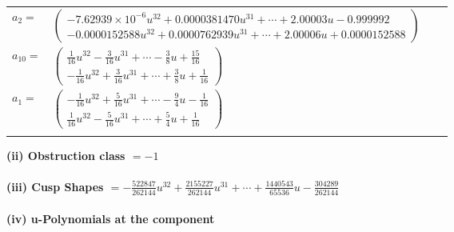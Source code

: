 \documentclass[1p]{elsarticle_modified}
\theoremstyle{definition}
\begin{document}
\begin{tabular}{m{7pt} m{180pt} m{7pt} m{180pt} }
\flushright $a_{2}=$&$\begin{pmatrix}-7.62939\times10^{-6} u^{32}+0.0000381470 u^{31}+\cdots+2.00003 u-0.999992\\-0.0000152588 u^{32}+0.0000762939 u^{31}+\cdots+2.00006 u+0.0000152588\end{pmatrix}$ \\
\flushright $a_{10}=$&$\begin{pmatrix}\frac{1}{16} u^{32}-\frac{3}{16} u^{31}+\cdots-\frac{3}{8} u+\frac{15}{16}\\-\frac{1}{16} u^{32}+\frac{3}{16} u^{31}+\cdots+\frac{3}{8} u+\frac{1}{16}\end{pmatrix}$ \\
\flushright $a_{1}=$&$\begin{pmatrix}-\frac{1}{16} u^{32}+\frac{5}{16} u^{31}+\cdots-\frac{9}{4} u-\frac{1}{16}\\\frac{1}{16} u^{32}-\frac{5}{16} u^{31}+\cdots+\frac{5}{4} u+\frac{1}{16}\end{pmatrix}$\\&\end{tabular}
\flushleft \textbf{(ii) Obstruction class $= -1$}\\~\\
\flushleft \textbf{(iii) Cusp Shapes $= -\frac{522847}{262144} u^{32}+\frac{2155227}{262144} u^{31}+\cdots+\frac{1440543}{65536} u-\frac{304289}{262144}$}\\~\\
\newpage\renewcommand{\arraystretch}{1}
\flushleft \textbf{(iv) u-Polynomials at the component}\newline \\
\end{document}
